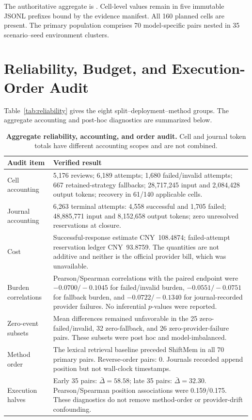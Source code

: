 The authoritative aggregate is
. Cell-level
values remain in five immutable JSONL prefixes bound by the evidence manifest.
All 160 planned cells are present. The primary population comprises 70
model-specific pairs nested in 35 scenario--seed environment clusters.

\section{Reliability, Budget, and Execution-Order Audit}
\label{app:reliability-audit}

Table~\ref{tab:reliability} gives the eight split--deployment--method groups.
The aggregate accounting and post-hoc diagnostics are summarized below.

\begin{table}[t]
  \centering
  \scriptsize
  \caption{\textbf{Aggregate reliability, accounting, and order audit.} Cell
  and journal token totals have different accounting scopes and are not
  combined.}
  \label{tab:audit-summary}
  \begin{tabular}{@{}p{}p{}@{}}
    \toprule
    Audit item & Verified result \\
    \midrule
    Cell accounting & 5,176 reviews; 6,189 attempts; 1,680 failed/invalid
    attempts; 667 retained-strategy fallbacks; 28,717,245 input and 2,084,428
    output tokens; recovery in 61/140 applicable cells. \\
    Journal accounting & 6,263 terminal attempts: 4,558 successful and 1,705
    failed; 48,885,771 input and 8,152,658 output tokens; zero unresolved
    reservations at closure. \\
    Cost & Successful-response estimate CNY~108.4874; failed-attempt reservation
    ledger CNY~93.8759. The quantities are not additive and neither is the
    official provider bill, which was unavailable. \\
    Burden correlations & Pearson/Spearman correlations with the paired endpoint
    were $-0.0700/-0.1045$ for failed/invalid burden,
    $-0.0551/-0.0751$ for fallback burden, and $-0.0722/-0.1340$ for
    journal-recorded provider failures. No inferential $p$-values were reported.
    \\
    Zero-event subsets & Mean differences remained unfavorable in the 25
    zero-failed/invalid, 32 zero-fallback, and 26 zero-provider-failure pairs.
    These subsets were post hoc and model-imbalanced. \\
    Method order & The lexical retrieval baseline preceded ShiftMem in all 70
    primary pairs. Reverse-order pairs: 0. Journals recorded append position but
    not wall-clock timestamps. \\
    Execution halves & Early 35 pairs: $\bar\Delta=58.58$; late 35 pairs:
    $\bar\Delta=32.30$. Pearson/Spearman position associations were 0.159/0.175.
    These diagnostics do not remove method-order or provider-drift confounding.
    \\
    \bottomrule
  \end{tabular}
\end{table}

